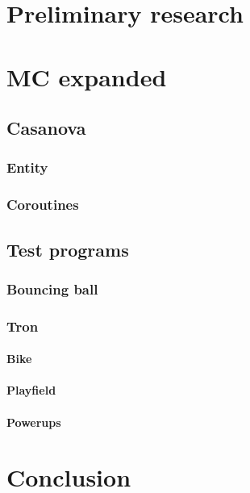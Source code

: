 \begin{multicols}{3}

% 

\part{Preliminary research}



\part{MC expanded}\label{part:mcexpanded}





\chapter{Casanova}
\section{Entity}
\section{Coroutines}

\chapter{Test programs}
\section{Bouncing ball}
\section{Tron}
\subsection{Bike}
\subsection{Playfield}
\subsection{Powerups}


\part{Conclusion}


\end{multicols}
